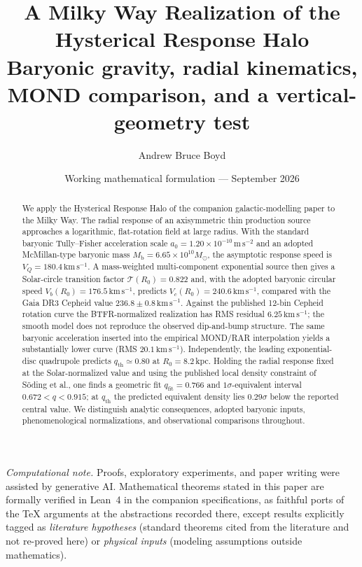 \documentclass[11pt]{article}
\title{\textbf{A Milky Way Realization of the Hysterical Response Halo}\\[0.35em]
\large Baryonic gravity, radial kinematics, MOND comparison, and a vertical-geometry test}
\author{Andrew Bruce Boyd}
\date{Working mathematical formulation --- September 2026}
\theoremstyle{definition}
\theoremstyle{remark}
\newcommand{\Msun}{M_\odot}
\newcommand{\kms}{\mathrm{km\,s^{-1}}}
\newcommand{\Mb}{M_{\mathrm{b}}}
\newcommand{\qth}{q_{\mathrm{th}}}
\newcommand{\qfit}{q_{\mathrm{fit}}}
\begin{document}
\maketitle
\noindent\textit{Computational note.}
Proofs, exploratory experiments, and paper writing were assisted by generative AI.
Mathematical theorems stated in this paper are formally verified in Lean~4 in the
companion specifications, as faithful ports of the TeX arguments at the abstractions
recorded there, except results explicitly tagged as \emph{literature hypotheses}
(standard theorems cited from the literature and not re-proved here) or
\emph{physical inputs} (modeling assumptions outside mathematics).

\begin{abstract}
We apply the Hysterical Response Halo of the companion galactic-modelling paper to the Milky Way.
The radial response of an axisymmetric thin production source approaches a logarithmic, flat-rotation field at large radius.
With the standard baryonic Tully--Fisher acceleration scale $a_0=1.20\times10^{-10}\,\mathrm{m\,s^{-2}}$ and an adopted McMillan-type baryonic mass $\Mb=6.65\times10^{10}\Msun$, the asymptotic response speed is $V_Q=180.4\,\kms$.
A mass-weighted multi-component exponential source then gives a Solar-circle transition factor $\mathcal T(R_0)=0.822$ and, with the adopted baryonic circular speed $V_b(R_0)=176.5\,\kms$, predicts $V_c(R_0)=240.6\,\kms$, compared with the Gaia DR3 Cepheid value $236.8\pm0.8\,\kms$.
Against the published 12-bin Cepheid rotation curve the BTFR-normalized realization has RMS residual $6.25\,\kms$; the smooth model does not reproduce the observed dip-and-bump structure.
The same baryonic acceleration inserted into the empirical MOND/RAR interpolation yields a substantially lower curve (RMS $20.1\,\kms$).
Independently, the leading exponential-disc quadrupole predicts $\qth\simeq0.80$ at $R_0=8.2\,$kpc.
Holding the radial response fixed at the Solar-normalized value and using the published local density constraint of S\"oding et al., one finds a geometric fit $\qfit=0.766$ and $1\sigma$-equivalent interval $0.672<q<0.915$; at $\qth$ the predicted equivalent density lies $0.29\sigma$ below the reported central value.
We distinguish analytic consequences, adopted baryonic inputs, phenomenological normalizations, and observational comparisons throughout.
\end{abstract}
\tableofcontents
\newpage
\end{document}
